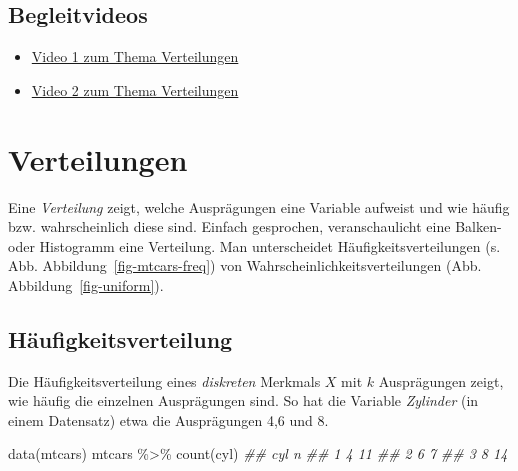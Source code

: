 \documentclass[
  a4paper,
  DIV=11]{scrreprt}
\newenvironment{Shaded}{\begin{snugshade}}{\end{snugshade}}
\newcommand{\DocumentationTok}[1]{\textcolor[rgb]{0.37,0.37,0.37}{\textit{#1}}}
\newcommand{\FunctionTok}[1]{\textcolor[rgb]{0.28,0.35,0.67}{#1}}
\newcommand{\NormalTok}[1]{\textcolor[rgb]{0.00,0.23,0.31}{#1}}
\newcommand{\SpecialCharTok}[1]{\textcolor[rgb]{0.37,0.37,0.37}{#1}}
\providecommand{\tightlist}{%
  \setlength{\itemsep}{0pt}\setlength{\parskip}{0pt}}\usepackage{longtable,booktabs,array}
\theoremstyle{definition}
\theoremstyle{remark}
\begin{document}
\hypertarget{begleitvideos-2}{%
\subsection{Begleitvideos}\label{begleitvideos-2}}

\begin{itemize}
\tightlist
\item
  \href{https://youtu.be/7GqIE4sKDs4}{Video 1 zum Thema Verteilungen}
\item
  \href{https://youtu.be/HKWwondYsW8}{Video 2 zum Thema Verteilungen}
\end{itemize}

\hypertarget{verteilungen-2}{%
\section{Verteilungen}\label{verteilungen-2}}

\begin{tcolorbox}[enhanced jigsaw, left=2mm, colframe=quarto-callout-important-color-frame, opacityback=0, arc=.35mm, rightrule=.15mm, breakable, toptitle=1mm, colbacktitle=quarto-callout-important-color!10!white, colback=white, coltitle=black, bottomrule=.15mm, titlerule=0mm, opacitybacktitle=0.6, bottomtitle=1mm, title=\textcolor{quarto-callout-important-color}{\faExclamation}\hspace{0.5em}{Wichtig}, toprule=.15mm, leftrule=.75mm]
Eine \emph{Verteilung} zeigt, welche Ausprägungen eine Variable aufweist
und wie häufig bzw. wahrscheinlich diese sind. Einfach gesprochen,
veranschaulicht eine Balken- oder Histogramm eine Verteilung. Man
unterscheidet Häufigkeitsverteilungen (s. Abb.
Abbildung~\ref{fig-mtcars-freq}) von Wahrscheinlichkeitsverteilungen
(Abb. Abbildung~\ref{fig-uniform}).
\end{tcolorbox}

\hypertarget{huxe4ufigkeitsverteilung}{%
\subsection{Häufigkeitsverteilung}\label{huxe4ufigkeitsverteilung}}

Die Häufigkeitsverteilung eines \emph{diskreten} Merkmals \(X\) mit
\(k\) Ausprägungen zeigt, wie häufig die einzelnen Ausprägungen sind. So
hat die Variable \emph{Zylinder} (in einem Datensatz) etwa die
Ausprägungen 4,6 und 8.

\begin{Shaded}
\begin{Highlighting}[]
\FunctionTok{data}\NormalTok{(mtcars)}
\NormalTok{  mtcars }\SpecialCharTok{\%\textgreater{}\%} 
    \FunctionTok{count}\NormalTok{(cyl)}
\DocumentationTok{\#\#   cyl  n}
\DocumentationTok{\#\# 1   4 11}
\DocumentationTok{\#\# 2   6  7}
\DocumentationTok{\#\# 3   8 14}
\end{Highlighting}
\end{Shaded}
\end{document}
